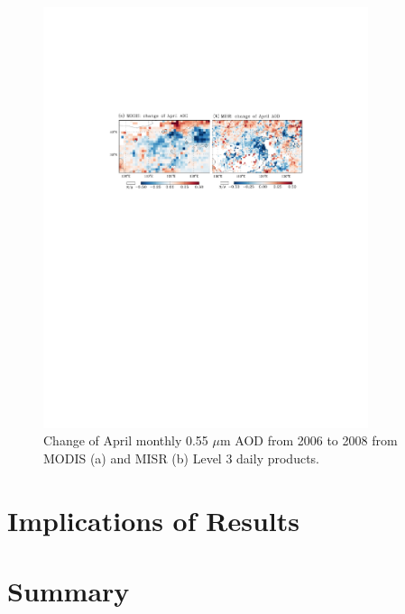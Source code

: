  \begin{figure}[h]
  \centering
  \includegraphics[width={0.85\textwidth}]{figures/a13.pdf}
  \caption{Change of April monthly 0.55 $\mu$m AOD from 2006 to 2008 from MODIS (a) and MISR (b) Level 3 daily products.}
  \label{fig:aodchange}
 \end{figure}

\section{Implications of Results}

\section{Summary}
